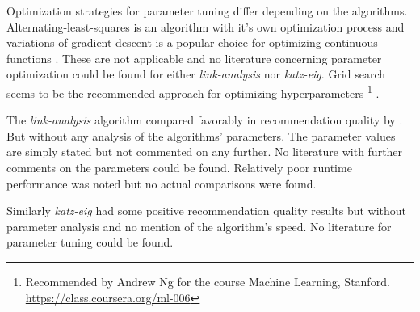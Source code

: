 
Optimization strategies for parameter tuning differ depending on the algorithms. Alternating-least-squares is an algorithm with it's own optimization process and variations of gradient descent is a popular choice for optimizing continuous functions \citep{hu2008collaborative}. These are not applicable and no literature concerning parameter optimization could be found for either \textit{link-analysis} nor \textit{katz-eig}.  Grid search seems to be the recommended approach for optimizing hyperparameters
\footnote{Recommended by Andrew Ng for the course Machine Learning, Stanford. \url{https://class.coursera.org/ml-006}}
.

The \textit{link-analysis} algorithm compared favorably in recommendation quality by \citep{huang2007comparison}. But without any analysis of the algorithms' parameters. The parameter values are simply stated but not commented on any further. No literature with further comments on the parameters could be found. Relatively poor runtime performance was noted \citep{huang2004link} but no actual comparisons were found.

Similarly \textit{katz-eig} had some positive recommendation quality results \citep{shin2012multi} but without parameter analysis and no mention of the algorithm's speed. No literature for parameter tuning could be found.

